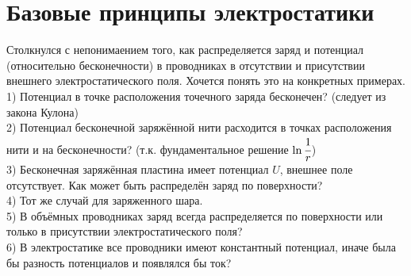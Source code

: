 \documentclass{report}
\begin{document}
\section{Базовые принципы электростатики}
Столкнулся с непонимаением того, как распределяется заряд и потенциал (относительно бесконечности) в проводниках в отсутствии и присутствии внешнего электростатического поля. Хочется понять это на конкретных примерах.\\
1) Потенциал в точке расположения точечного заряда бесконечен? (следует из закона Кулона)\\
2) Потенциал бесконечной заряжённой нити расходится в точках расположения нити и на бесконечности? (т.к. фундаментальное решение $\ln{\cfrac{1}{r}}$)\\
3) Бесконечная заряжённая пластина имеет потенциал $U$, внешнее поле отсутствует. Как может быть распределён заряд по поверхности?\\
4) Тот же случай для заряженного шара.\\
5) В объёмных проводниках заряд всегда распределяется по поверхности или только в присутствии электростатического поля?\\
6) В электростатике все проводники имеют константный потенциал, иначе была бы разность потенциалов и появлялся бы ток?\\

	
\end{document}
